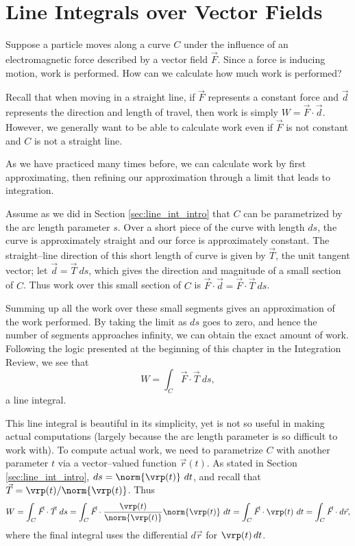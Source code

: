\section{Line Integrals over Vector Fields}\label{sec:line_int_vf}
Suppose a particle moves along a curve $C$ under the influence of an electromagnetic force described by a vector field $\vec F$. Since a force is inducing motion, work is performed. How can we calculate how much work is performed?

Recall that when moving in a straight line, if $\vec F$ represents a constant force and $\vec d$ represents the direction and length of travel, then work is simply $W = \vec F\cdot \vec d$. However, we generally want to be able to calculate work even if $\vec F$ is not constant and $C$ is not a straight line.

As we have practiced many times before, we can calculate work by first approximating, then refining our approximation through a limit that leads to integration. 

Assume as we did in Section \ref{sec:line_int_intro} that $C$ can be parametrized by the arc length parameter $s$. Over a short piece of the curve with length $ds$, the curve is approximately straight and our force is approximately constant. The straight--line direction of this short length of curve is given by $\vec T$, the unit tangent vector;   let $\vec d = \vec T\ ds$, which gives  the direction and magnitude of a small section of $C$. Thus work over this small section of $C$ is $\vec F \cdot \vec d = \vec F\cdot \vec T\ ds$. 

Summing up all the work over these small segments gives an approximation of the work performed. By taking the limit as $ds$ goes to zero, and hence the number of segments approaches infinity, we can obtain the exact amount of work. Following the logic presented at the beginning of this chapter in the Integration Review, we see that 
$$W = \int_C \vec F\cdot \vec T\ ds,$$
a line integral.

This line integral is beautiful in its simplicity, yet is not so useful in making actual computations (largely because the arc length parameter is so difficult to work with). To compute actual work, we need to parametrize $C$ with another parameter  $t$ via a vector--valued function $\vec r(t)$. As stated in Section \ref{sec:line_int_intro}, $ds = \norm{\vrp(t)}\ dt$, and recall that $\vec T = \vrp(t)/\norm{\vrp(t)}$. Thus
\begin{equation}
W = \int_C \vec F\cdot\vec T\ ds = \int_C \vec F\cdot \frac{\vrp(t)}{\norm{\vrp(t)}}\norm{\vrp(t)}\ dt = \int_C\vec F\cdot \vrp(t)\ dt = \int_C \vec F\cdot d\vec r,
\label{eq:line_integral}\end{equation}
where the final integral uses the differential $d\vec r$ for $\vrp(t)\,dt$.

